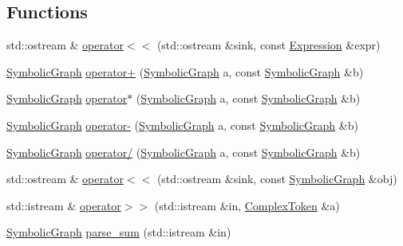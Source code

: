 \subsection*{Functions}
\begin{DoxyCompactItemize}
\item 
std\+::ostream \& \mbox{\hyperlink{namespacesymcpp_a4665478217d9f0b9d2f3b815ae8d1bd4}{operator$<$$<$}} (std\+::ostream \&sink, const \mbox{\hyperlink{classsymcpp_1_1Expression}{Expression}} \&expr)
\item 
\mbox{\hyperlink{classsymcpp_1_1SymbolicGraph}{Symbolic\+Graph}} \mbox{\hyperlink{namespacesymcpp_a158d9eeff81ccfd1af9b8376ed2d05cc}{operator+}} (\mbox{\hyperlink{classsymcpp_1_1SymbolicGraph}{Symbolic\+Graph}} a, const \mbox{\hyperlink{classsymcpp_1_1SymbolicGraph}{Symbolic\+Graph}} \&b)
\item 
\mbox{\hyperlink{classsymcpp_1_1SymbolicGraph}{Symbolic\+Graph}} \mbox{\hyperlink{namespacesymcpp_a6d2e774f2cce2b171bea1416d772b833}{operator$\ast$}} (\mbox{\hyperlink{classsymcpp_1_1SymbolicGraph}{Symbolic\+Graph}} a, const \mbox{\hyperlink{classsymcpp_1_1SymbolicGraph}{Symbolic\+Graph}} \&b)
\item 
\mbox{\hyperlink{classsymcpp_1_1SymbolicGraph}{Symbolic\+Graph}} \mbox{\hyperlink{namespacesymcpp_ac2f5ad1173cb5fabb4b8d346878e5035}{operator-\/}} (\mbox{\hyperlink{classsymcpp_1_1SymbolicGraph}{Symbolic\+Graph}} a, const \mbox{\hyperlink{classsymcpp_1_1SymbolicGraph}{Symbolic\+Graph}} \&b)
\item 
\mbox{\hyperlink{classsymcpp_1_1SymbolicGraph}{Symbolic\+Graph}} \mbox{\hyperlink{namespacesymcpp_a4ec0ca24703ac5e096fceeb538d9e1a9}{operator/}} (\mbox{\hyperlink{classsymcpp_1_1SymbolicGraph}{Symbolic\+Graph}} a, const \mbox{\hyperlink{classsymcpp_1_1SymbolicGraph}{Symbolic\+Graph}} \&b)
\item 
std\+::ostream \& \mbox{\hyperlink{namespacesymcpp_a7ad455b0637c10962ac159edf36b2754}{operator$<$$<$}} (std\+::ostream \&sink, const \mbox{\hyperlink{classsymcpp_1_1SymbolicGraph}{Symbolic\+Graph}} \&obj)
\item 
std\+::istream \& \mbox{\hyperlink{namespacesymcpp_a9fe2d34ad3d273d051795b9a25d3c8ce}{operator$>$$>$}} (std\+::istream \&in, \mbox{\hyperlink{structsymcpp_1_1ComplexToken}{Complex\+Token}} \&a)
\item 
\mbox{\hyperlink{classsymcpp_1_1SymbolicGraph}{Symbolic\+Graph}} \mbox{\hyperlink{namespacesymcpp_a8fbf78e8fe2706165843d5716ff9025f}{parse\+\_\+sum}} (std\+::istream \&in)
\item 

\end{DoxyCompactItemize}
